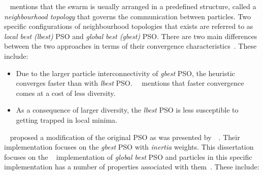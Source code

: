 \citeauthor{ref:vanwyk:2014}~\cite{ref:vanwyk:2014} mentions that the swarm is usually arranged in a predefined structure, called a \textit{neighbourhood topology} that governs the communication between particles. Two specific configurations of neighbourhood topologies that exists are referred to as \textit{local best (lbest)} \acs{PSO} and \textit{global best (gbest)} \acs{PSO}. There are two main differences between the two approaches in terms of their convergence characteristics~\cite{ref:eberhart:1996}. These include:

\begin{itemize}
      \item Due to the larger particle interconnectivity of \textit{gbest} \acs{PSO}, the heuristic converges faster than with \textit{lbest} \acs{PSO}.~\citeauthor{ref:engelbrecht:2007}~\cite{ref:engelbrecht:2007} mentions that faster convergence comes at a cost of less diversity.

      \item As a consequence of larger diversity, the \textit{lbest} \acs{PSO} is less susceptible to getting trapped in local minima.
\end{itemize}

\noindent
\citeauthor{ref:shi:1998}~\cite{ref:shi:1998} proposed a modification of the original \acs{PSO} as was presented by~\citeauthor{ref:kennedy:1995}~\cite{ref:kennedy:1995}. Their implementation focuses on the \textit{gbest} \acs{PSO} with \textit{inertia} weights. This dissertation focuses on the \citeauthor{ref:shi:1998}~\cite{ref:shi:1998} implementation of \textit{global best} \acs{PSO} and particles in this specific implementation has a number of properties associated with them~\cite{ref:vanwyk:2014}. These include:

